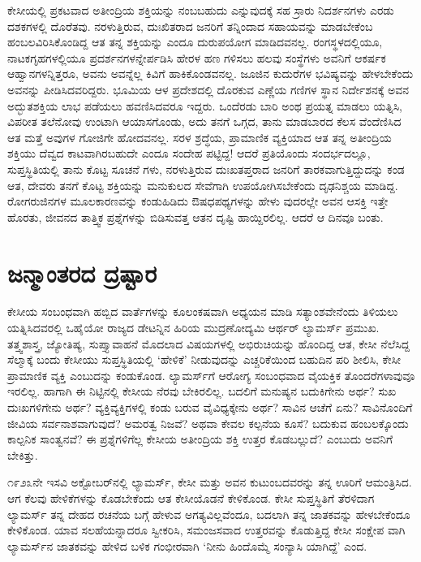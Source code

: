 ಕೇಸೀಯಲ್ಲಿ ಪ್ರಕಟವಾದ ಅತೀಂದ್ರಿಯ ಶಕ್ತಿಯನ್ನು ನಂಬಬಹುದು ಎನ್ನುವುದಕ್ಕೆ ಸಹ ಸ್ರಾರು ನಿದರ್ಶನಗಳು ಎರಡು ದಶಕಗಳಲ್ಲಿ ದೊರೆತವು. ನರಳುತ್ತಿರುವ, ದುಃಖಿತರಾದ ಜನರಿಗೆ ತನ್ನಿಂದಾದ ಸಹಾಯವನ್ನು ಮಾಡಬೇಕೆಂಬ ಹಂಬಲವಿರಿಸಿಕೊಂಡಿದ್ದ ಆತ ತನ್ನ ಶಕ್ತಿಯನ್ನು ಎಂದೂ ದುರುಪಯೋಗ ಮಾಡಿದವನಲ್ಲ. ರಂಗಸ್ಥಳದಲ್ಲಿಯೂ, ನಾಟಕಗೃಹಗಳಲ್ಲಿಯೂ ಪ್ರದರ್ಶನಗಳನ್ನೇರ್ಪಡಿಸಿ ಹೇರಳ ಹಣ ಗಳಿಸಲು ಹಲವು ಸಂಸ್ಥೆಗಳು ಅವನಿಗೆ ಆಕರ್ಷಕ ಆಹ್ವಾನಗಳನ್ನಿತ್ತರೂ, ಅವನು ಅವನ್ನೆಲ್ಲ ಕಿವಿಗೆ ಹಾಕಿಕೊಂಡವನಲ್ಲ. ಜೂಜಿನ ಕುದುರೆಗಳ ಭವಿಷ್ಯವನ್ನು ಹೇಳಬೇಕೆಂದು ಅವನನ್ನು ಪೀಡಿಸಿದವರಿದ್ದರು. ಭೂಮಿಯ ಆಳ ಪ್ರದೇಶದಲ್ಲಿ ದೊರಕುವ ಎಣ್ಣೆಯ ಗಣಿಗಳ ಸ್ಥಾನ ನಿರ್ದೇಶನಕ್ಕೆ ಅವನ ಅದ್ಭುತಶಕ್ತಿಯ ಲಾಭ ಪಡೆಯಲು ಹವಣಿಸಿದವರೂ ಇದ್ದರು. ಒಂದೆರಡು ಬಾರಿ ಅಂಥ ಪ್ರಯತ್ನ ಮಾಡಲು ಯತ್ನಿಸಿ, ವಿಪರೀತ ತಲೆನೋವು ಉಂಟಾಗಿ ಆಯಾಸಗೊಂಡು, ಅದು ತನಗೆ ಒಗ್ಗದ, ತಾನು ಮಾಡಬಾರದ ಕೆಲಸ ವೆಂದೆಣಿಸಿದ ಆತ ಮತ್ತೆ ಅವುಗಳ ಗೋಜಿಗೇ ಹೋದವನಲ್ಲ. ಸರಳ ಶ್ರದ್ಧೆಯ, ಪ್ರಾಮಾಣಿಕ ವ್ಯಕ್ತಿಯಾದ ಆತ ತನ್ನ ಅತೀಂದ್ರಿಯ ಶಕ್ತಿಯು ದೆವ್ವದ ಕಾಟವಾಗಿರಬಹುದೇ ಎಂದೂ ಸಂದೇಹ ಪಟ್ಟಿದ್ದ! ಆದರೆ ಪ್ರತಿಯೊಂದು ಸಂದರ್ಭದಲ್ಲೂ, ಸುಪ್ತಸ್ಥಿತಿಯಲ್ಲಿ ತಾನು ಕೊಟ್ಟ ಸೂಚನೆ ಗಳು, ನರಳುತ್ತಿರುವ ದುಃಖತಪ್ತರಾದ ಜನರಿಗೆ ತಾರಕವಾಗುತ್ತಿದ್ದುದನ್ನು ಕಂಡ ಆತ, ದೇವರು ತನಗೆ ಕೊಟ್ಟ ಶಕ್ತಿಯನ್ನು ಮನುಕುಲದ ಸೇವೆಗಾಗಿ ಉಪಯೋಗಿಸಬೇಕೆಂದು ದೃಢನಿಶ್ಚಯ ಮಾಡಿದ್ದ. ರೋಗರುಜಿನಗಳ ಮೂಲಕಾರಣವನ್ನು ಕಂಡುಹಿಡಿದು ಔಷಧಪಥ್ಯಗಳನ್ನು ಹೇಳು ವುದರಲ್ಲೇ ಅವನ ಆಸಕ್ತಿ ಇತ್ತೇ ಹೊರತು, ಜೀವನದ ತಾತ್ತ್ವಿಕ ಪ್ರಶ್ನೆಗಳನ್ನು ಬಿಡಿಸುವತ್ತ ಆತನ ದೃಷ್ಟಿ ಹಾಯ್ದಿರಲಿಲ್ಲ. ಆದರೆ ಆ ದಿನವೂ ಬಂತು.


\section{ಜನ್ಮಾಂತರದ ದ್ರಷ್ಟಾರ}

ಕೇಸೀಯ ಸಂಬಂಧವಾಗಿ ಹಬ್ಬಿದ ವಾರ್ತೆಗಳನ್ನು ಕೂಲಂಕಷವಾಗಿ ಅಧ್ಯಯನ ಮಾಡಿ ಸತ್ಯಾಂಶವೇನೆಂದು ತಿಳಿಯಲು ಯತ್ನಿಸಿದವರಲ್ಲಿ ಒಹೈಯೋ ರಾಜ್ಯದ ಡೇಟನ್ನಿನ ಹಿರಿಯ ಮುದ್ರಣೋದ್ಯಮಿ ಆರ್ಥರ್ ಲ್ಯಾಮರ್ಸ್ ಪ್ರಮುಖ. ತತ್ತ್ವಶಾಸ್ತ್ರ, ಜ್ಯೋತಿಷ್ಯ, ಸುಪ್ತ್ಯಾವಾಹನೆ ಮೊದಲಾದ ವಿಷಯಗಳಲ್ಲಿ ಅಭಿರುಚಿಯನ್ನು ಹೊಂದಿದ್ದ ಆತ, ಕೇಸೀ ನೆಲೆಸಿದ್ದ ಸೆಲ್ಮಾಕ್ಕೆ ಬಂದು ಕೇಸೀಯು ಸುಪ್ತಸ್ಥಿತಿಯಲ್ಲಿ ‘ಹೇಳಿಕೆ’ ನೀಡುವುದನ್ನು ಎಚ್ಚರಿಕೆಯಿಂದ ಬಹುದಿನ ಪರಿ ಶೀಲಿಸಿ, ಕೇಸೀ ಪ್ರಾಮಾಣಿಕ ವ್ಯಕ್ತಿ ಎಂಬುದನ್ನು ಕಂಡುಕೊಂಡ. ಲ್ಯಾಮರ್ಸ್​ಗೆ ಆರೋಗ್ಯ ಸಂಬಂಧವಾದ ವೈಯಕ್ತಿಕ ತೊಂದರೆಗಳಾವುವೂ ಇರಲಿಲ್ಲ. ಹಾಗಾಗಿ ಈ ನಿಟ್ಟಿನಲ್ಲಿ ಕೇಸೀಯ ನೆರವು ಬೇಕಿರಲಿಲ್ಲ. ಬದಲಿಗೆ ಮನುಷ್ಯನ ಬದುಕಿಗೇನು ಅರ್ಥ? ಸುಖ ದುಃಖಗಳಿಗೇನು ಅರ್ಥ? ವ್ಯಕ್ತಿವ್ಯಕ್ತಿಗಳಲ್ಲಿ ಕಂಡು ಬರುವ ವೈವಿಧ್ಯಕ್ಕೇನು ಅರ್ಥ? ಸಾವಿನ ಆಚೆಗೆ ಏನು? ಸಾವಿನೊಂದಿಗೆ ಜೀವಿಯ ಸರ್ವನಾಶವಾಗುವುದೆ? ಅಮರತ್ವ ನಿಜವೆ? ಅಥವಾ ಕೇವಲ ಕಲ್ಪನೆಯ ಕೂಸೆ? ಬದುಕುವ ಹಂಬಲಕ್ಕೊಂದು ಕಾಲ್ಪನಿಕ ಸಾಂತ್ವನವೆ? ಈ ಪ್ರಶ್ನೆಗಳಿಗೆಲ್ಲ ಕೇಸೀಯ ಅತೀಂದ್ರಿಯ ಶಕ್ತಿ ಉತ್ತರ ಕೊಡಬಲ್ಲುದೆ? ಎಂಬುದು ಅವನಿಗೆ ಬೇಕಿತ್ತು.

೧೯೨೩ನೇ ಇಸವಿ ಅಕ್ಟೋಬರ್​ನಲ್ಲಿ ಲ್ಯಾಮರ್ಸ್, ಕೇಸೀ ಮತ್ತು ಅವನ ಕುಟುಂಬದವರನ್ನು ತನ್ನ ಊರಿಗೆ ಆಮಂತ್ರಿಸಿದ. ಆಗ ಕೆಲವು ಹೇಳಿಕೆಗಳನ್ನು ಕೊಡಬೇಕೆಂದು ಆತ ಕೇಸೀಯೊಡನೆ ಕೇಳಿಕೊಂಡ. ಕೇಸೀ ಸುಪ್ತಸ್ಥಿತಿಗೆ ತೆರಳಿದಾಗ ಲ್ಯಾಮರ್ಸ್ ತನ್ನ ದೇಹದ ರಚನೆಯ ಬಗ್ಗೆ ಹೇಳುವ ಅಗತ್ಯವಿಲ್ಲವೆಂದೂ, ಬದಲಾಗಿ ತನ್ನ ಜಾತಕವನ್ನು ಹೇಳಬೇಕೆಂದೂ ಕೇಳಿಕೊಂಡ. ಯಾವ ಸಲಹೆಯನ್ನಾದರೂ ಸ್ವೀಕರಿಸಿ, ಸಮಂಜಸವಾದ ಉತ್ತರವನ್ನು ಕೊಡುತ್ತಿದ್ದ ಕೇಸೀ ಸಂಕ್ಷೇಪ ವಾಗಿ ಲ್ಯಾಮರ್ಸ್​ನ ಜಾತಕವನ್ನು ಹೇಳಿದ ಬಳಿಕ ಗಂಭೀರವಾಗಿ ‘ನೀನು ಹಿಂದೊಮ್ಮೆ ಸಂನ್ಯಾಸಿ ಯಾಗಿದ್ದೆ’ ಎಂದ.

